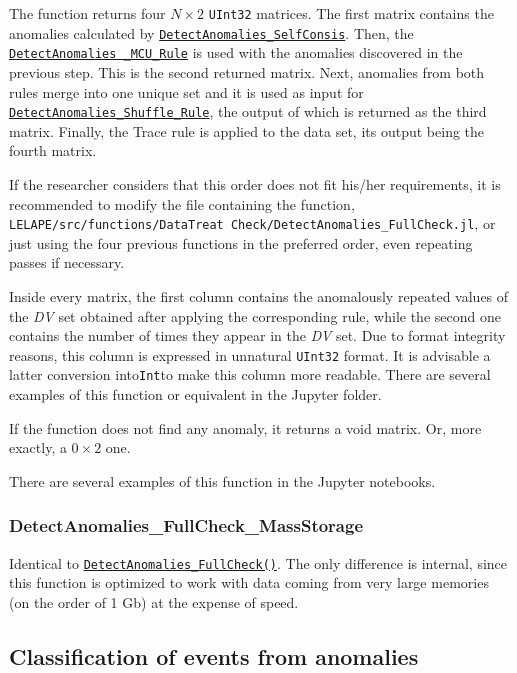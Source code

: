 \begin{itemize}
\begin{itemize}
 	\end{itemize}
 	
 	The function returns four \(N\times 2\) \texttt{UInt32} matrices. The first matrix contains the anomalies calculated by \hyperref[Fun:DetectAnomaliesSelfConsis]{\texttt{DetectAnomalies\_SelfConsis}}. Then, the \hyperref[Fun:DetectAnomaliesMCURule]{\texttt{DetectAnomalies \_MCU\_Rule}} is used with the anomalies discovered in the previous step. This is the second returned matrix. Next, anomalies from both rules merge into one unique set and it is used as input for \hyperref[Fun:DetectAnomaliesShuffleRule]{\texttt{DetectAnomalies\_Shuffle\_Rule}}, the output of which is returned as the third matrix. Finally, the Trace rule is applied to the data set, its output being the fourth matrix.
 	
 	If the researcher considers that this order does not fit his/her requirements, it is recommended to modify the file containing the function, \texttt{LELAPE/src/functions/DataTreat Check/DetectAnomalies\_FullCheck.jl}, or just using the four previous functions in the preferred order, even repeating passes if necessary.
 	
 	Inside every matrix, the first column contains the anomalously repeated values of the \textit{DV} set obtained after applying the corresponding rule, while the second one contains the number of times they appear in the \textit{DV} set. Due to format integrity reasons, this column is expressed in unnatural \texttt{UInt32} format.  	
 	It is advisable a latter conversion into\texttt{Int}to make this column more readable. There are several examples of this function or equivalent in the Jupyter folder.
 	
 	If the function does not find any anomaly, it returns a void matrix.  Or, more exactly, a \(0\times 2\) one. 
 	
 	There are several examples of this function in the Jupyter notebooks.
 \end{itemize}
%
\subsubsection*{DetectAnomalies\_FullCheck\_MassStorage}\label{Fun:DetectAnomaliesFullCheck_MassStorage}
%
Identical to \hyperref[Fun:DetectAnomaliesFullCheck]{\texttt{DetectAnomalies\_FullCheck()}}. The only difference is internal, since this function is optimized to work with data coming from very large memories (on the order of 1 Gb) at the expense of speed. 
%
%
 \subsection{Classification of events from anomalies}\label{SubSec:ClassificationEventsFromAnomalies}
